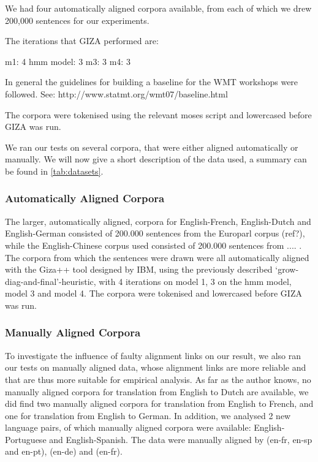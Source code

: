 \documentclass{report}
\begin{document}
We had four automatically aligned corpora available, from each of which we drew 200,000 sentences for our experiments. 

The iterations that GIZA performed are:

m1: 4
hmm model: 3
m3: 3
m4: 3

In general the guidelines for building a baseline for the WMT workshops were followed. See:
http://www.statmt.org/wmt07/baseline.html

The corpora were tokenised using the relevant moses script and lowercased before GIZA was run.



We ran our tests on several corpora, that were either aligned automatically or manually.  We will now give a short description of the data used, a summary can be found in \ref{tab:datasets}.

\subsubsection{Automatically Aligned Corpora}
The larger, automatically aligned, corpora for English-French, English-Dutch and English-German consisted of 200.000 sentences from the Europarl corpus (ref?), while the English-Chinese corpus used consisted of 200.000 sentences from .... . The corpora from which the sentences were drawn were all automatically aligned with the Giza++ tool \citep{koehn2007moses} designed by IBM, using the previously described `grow-diag-and-final'-heuristic, with 4 iterations on model 1, 3 on the hmm model, model 3 and model 4. The corpora were tokenised and lowercased before GIZA was run.


\subsubsection{Manually Aligned Corpora}
To investigate the influence of faulty alignment links on our result, we also ran our tests on manually aligned data, whose alignment links are more reliable and that are thus more suitable for empirical analysis. As far as the author knows, no manually aligned corpora for translation from English to Dutch are available, we did find two manually aligned corpora for translation from English to French, and one for translation from English to German. In addition, we analysed  2 new language pairs, of which manually aligned corpora were available: English-Portuguese and English-Spanish. The data were manually aligned by \cite{graca2008building} (en-fr, en-sp and en-pt), \cite{pado2006optimal} (en-de) and \cite{och2000improved} (en-fr).
\end{document}
